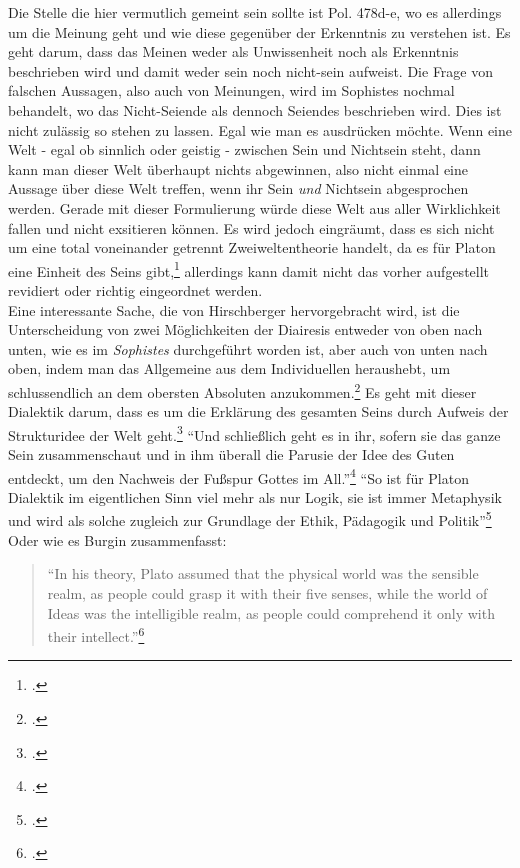 \documentclass[12pt]{article}
\newcommand*{\zitatblock}[1]{%
    \begin{quote}
    \fontsize{10}{12}\selectfont
    \setlength{\parskip}{1.0em}
    #1
    \end{quote}
}
\begin{document}
Die Stelle die hier vermutlich gemeint sein sollte ist Pol. 478d-e, wo es allerdings um die Meinung geht und wie diese gegenüber der Erkenntnis zu verstehen ist. Es geht darum, dass das Meinen weder als Unwissenheit noch als Erkenntnis beschrieben wird und damit weder sein noch nicht-sein aufweist. Die Frage von falschen Aussagen, also auch von Meinungen, wird im Sophistes nochmal behandelt, wo das Nicht-Seiende als dennoch Seiendes beschrieben wird. 
Dies ist nicht zulässig so stehen zu lassen. Egal wie man es ausdrücken möchte. Wenn eine Welt - egal ob sinnlich oder geistig - zwischen Sein und Nichtsein steht, dann kann man dieser Welt überhaupt nichts abgewinnen, also nicht einmal eine Aussage über diese Welt treffen, wenn ihr Sein \emph{und} Nichtsein abgesprochen werden. 
Gerade mit dieser Formulierung würde diese Welt aus aller Wirklichkeit fallen und nicht exsitieren können.
Es wird jedoch eingräumt, dass es sich nicht um eine total voneinander getrennt Zweiweltentheorie handelt, da es für Platon eine Einheit des Seins gibt,\footcite[vgl][S. 100]{Hirschberger} allerdings kann damit nicht das vorher aufgestellt revidiert oder richtig eingeordnet werden.\\
Eine interessante Sache, die von Hirschberger hervorgebracht wird, ist die Unterscheidung von zwei Möglichkeiten der Diairesis entweder von oben nach unten, wie es im \emph{Sophistes} durchgeführt worden ist, aber auch von unten nach oben, indem man das Allgemeine aus dem Individuellen heraushebt, um schlussendlich an dem obersten Absoluten anzukommen.\footcite[vgl.][S. 106f.]{Hirschberger} 
Es geht mit dieser Dialektik darum, dass es um die Erklärung des gesamten Seins durch Aufweis der Strukturidee der Welt geht.\footcite[vgl.][S. 107]{Hirschberger}
\enquote{Und schließlich geht es in ihr, sofern sie das ganze Sein zusammenschaut und in ihm überall die Parusie der Idee des Guten entdeckt, um den Nachweis der Fußspur Gottes im All.}\footcite[][S. 107]{Hirschberger}
\enquote{So ist für Platon Dialektik im eigentlichen Sinn viel mehr als nur Logik, sie ist immer Metaphysik und wird als solche zugleich zur Grundlage der Ethik, Pädagogik und Politik}\footcite[][S. 108]{Hirschberger}
Oder wie es Burgin zusammenfasst: \zitatblock{\enquote{In his theory, Plato assumed that the physical world was the sensible realm, as people could grasp it with their five senses, while the world of Ideas was the intelligible realm, as people could comprehend it only with their intellect.}\footcite[][S. 179]{Burgin}}
\end{document}
